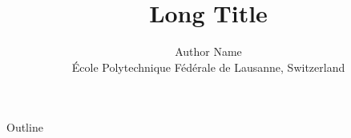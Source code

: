 \documentclass{beamer}
\author[.@epfl.ch]{ Author Name  \\
\'Ecole Polytechnique F\'ed\'erale de Lausanne, Switzerland}
\title[Short Title]{Long Title}
\begin{document}
 
%
\frame{\titlepage}

%
\begin{frame}{Outline}
\tableofcontents
\end{frame}
%
\end{document}
